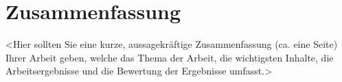 %

\chapter{Zusammenfassung}

<Hier sollten Sie eine kurze, aussagekräftige Zusammenfassung (ca. eine Seite) Ihrer Arbeit geben, welche das Thema der Arbeit, die wichtigsten Inhalte, die Arbeitsergebnisse und die Bewertung der Ergebnisse umfasst.> 
